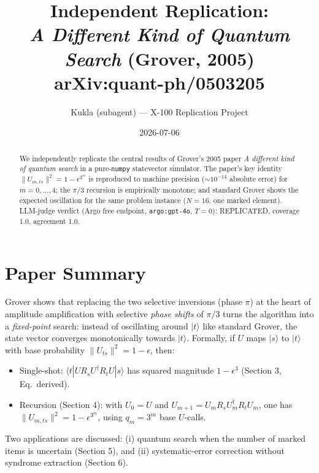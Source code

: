 \documentclass[11pt]{article}
\title{Independent Replication: \\
\emph{A Different Kind of Quantum Search} (Grover, 2005) \\
arXiv:quant-ph/0503205}
\author{Kukla (subagent) --- X-100 Replication Project}
\date{2026-07-06}
\begin{document}
\maketitle

\begin{abstract}
We independently replicate the central results of Grover's 2005 paper
\emph{A different kind of quantum search} in a pure-\texttt{numpy} statevector
simulator. The paper's key identity
$\|U_{m,ts}\|^2 = 1 - \epsilon^{3^m}$ is reproduced to machine precision
($\sim 10^{-14}$ absolute error) for $m = 0, \dots, 4$; the $\pi/3$ recursion
is empirically monotone; and standard Grover shows the expected oscillation
for the same problem instance ($N = 16$, one marked element). LLM-judge
verdict (Argo free endpoint, \texttt{argo:gpt-4o}, $T = 0$): REPLICATED,
coverage 1.0, agreement 1.0.
\end{abstract}

\tableofcontents

\section{Paper Summary}
Grover shows that replacing the two selective inversions (phase $\pi$) at the
heart of amplitude amplification with selective \emph{phase shifts} of $\pi/3$
turns the algorithm into a \emph{fixed-point} search: instead of oscillating
around $|t\rangle$ like standard Grover, the state vector converges monotonically
towards $|t\rangle$. Formally, if $U$ maps $|s\rangle$ to $|t\rangle$ with base
probability $\|U_{ts}\|^2 = 1 - \epsilon$, then:
\begin{itemize}
  \item Single-shot: $\langle t | U R_s U^\dagger R_t U | s \rangle$ has squared
        magnitude $1 - \epsilon^3$ (Section 3, Eq.\ derived).
  \item Recursion (Section 4): with $U_0 = U$ and
        $U_{m+1} = U_m R_s U_m^\dagger R_t U_m$, one has
        $\|U_{m,ts}\|^2 = 1 - \epsilon^{3^m}$, using $q_m = 3^m$ base $U$-calls.
\end{itemize}
Two applications are discussed: (i) quantum search when the number of marked
items is uncertain (Section 5), and (ii) systematic-error correction without
syndrome extraction (Section 6).
\end{document}
